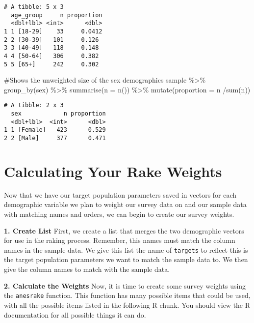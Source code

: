 \documentclass[
  letterpaper,
  DIV=11,
  numbers=noendperiod]{scrreprt}
\newenvironment{Shaded}{\begin{snugshade}}{\end{snugshade}}
\newcommand{\AttributeTok}[1]{\textcolor[rgb]{0.40,0.45,0.13}{#1}}
\newcommand{\CommentTok}[1]{\textcolor[rgb]{0.37,0.37,0.37}{#1}}
\newcommand{\FunctionTok}[1]{\textcolor[rgb]{0.28,0.35,0.67}{#1}}
\newcommand{\NormalTok}[1]{\textcolor[rgb]{0.00,0.23,0.31}{#1}}
\newcommand{\SpecialCharTok}[1]{\textcolor[rgb]{0.37,0.37,0.37}{#1}}
\begin{document}
\begin{verbatim}
# A tibble: 5 x 3
  age_group     n proportion
  <dbl+lbl> <int>      <dbl>
1 1 [18-29]    33     0.0412
2 2 [30-39]   101     0.126 
3 3 [40-49]   118     0.148 
4 4 [50-64]   306     0.382 
5 5 [65+]     242     0.302 
\end{verbatim}

\begin{Shaded}
\begin{Highlighting}[]
\CommentTok{\#Shows the unweighted size of the sex demographics}
\NormalTok{sample }\SpecialCharTok{\%\textgreater{}\%}
  \FunctionTok{group\_by}\NormalTok{(sex) }\SpecialCharTok{\%\textgreater{}\%}
  \FunctionTok{summarise}\NormalTok{(}\AttributeTok{n =} \FunctionTok{n}\NormalTok{()) }\SpecialCharTok{\%\textgreater{}\%} 
  \FunctionTok{mutate}\NormalTok{(}\AttributeTok{proportion =}\NormalTok{ n }\SpecialCharTok{/}\FunctionTok{sum}\NormalTok{(n))}
\end{Highlighting}
\end{Shaded}

\begin{verbatim}
# A tibble: 2 x 3
  sex            n proportion
  <dbl+lbl>  <int>      <dbl>
1 1 [Female]   423      0.529
2 2 [Male]     377      0.471
\end{verbatim}

\hypertarget{calculating-your-rake-weights}{%
\section{Calculating Your Rake
Weights}\label{calculating-your-rake-weights}}

Now that we have our target population parameters saved in vectors for
each demographic variable we plan to weight our survey data on and our
sample data with matching names and orders, we can begin to create our
survey weights.

\textbf{1. Create List} First, we create a list that merges the two
demographic vectors for use in the raking process. Remember, this names
must match the column names in the sample data. We give this list the
name of \texttt{targets} to reflect this is the target population
parameters we want to match the sample data to. We then give the column
names to match with the sample data.

\textbf{2. Calculate the Weights} Now, it is time to create some survey
weights using the \texttt{anesrake} function. This function has many
possible items that could be used, with all the possible items listed in
the following R chunk. You should view the R documentation for all
possible things it can do.
\end{document}
